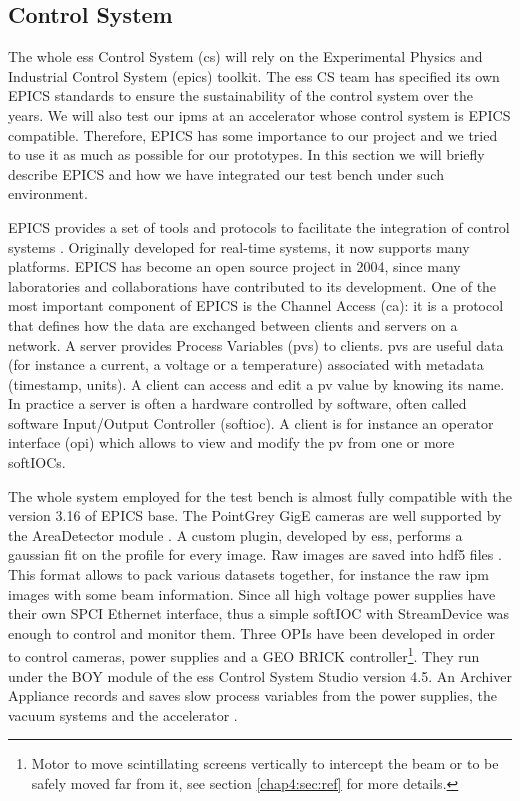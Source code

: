 \begin{refsection}
  

  \subsection{Control System}
  The whole \acrshort{ess} Control System (\acrshort{cs}) will rely on the Experimental Physics and Industrial Control System (\acrshort{epics}) toolkit. The \acrshort{ess} CS team has specified its own EPICS standards to ensure the sustainability of the control system over the years. We will also test our \acrshort{ipm}s at an accelerator whose control system is EPICS compatible. Therefore, EPICS has some importance to our project and we tried to use it as much as possible for our prototypes. In this section we will briefly describe EPICS and how we have integrated our test bench under such environment.

  EPICS provides a set of tools and protocols to facilitate the integration of control systems \cite{epics2019}. Originally developed for real-time systems, it now supports many platforms. EPICS has become an open source project in 2004, since many laboratories and collaborations have contributed to its development.
  One of the most important component of EPICS is the Channel Access (\acrshort{ca}): it is a protocol that defines how the data are exchanged between clients and servers on a network. A server provides Process Variables (\acrshort{pv}s) to clients. \acrshort{pv}s are useful data (for instance a current, a voltage or a temperature) associated with metadata (timestamp, units). A client can access and edit a \acrshort{pv} value by knowing its name. In practice a server is often a hardware controlled by software, often called software Input/Output Controller (\acrshort{softioc}). A client is for instance an operator interface (\acrshort{opi}) which allows to view and modify the \acrshort{pv} from one or more softIOCs.

  The whole system employed for the test bench is almost fully compatible with the version 3.16 of EPICS base. The PointGrey GigE cameras are well supported by the AreaDetector module \cite{ad2019}. A custom plugin, developed by \acrshort{ess}, performs a gaussian fit on the profile for every image. Raw images are saved into \acrshort{hdf}5 files \cite{hdf5}. This format allows to pack various datasets together, for instance the raw \acrshort{ipm} images with some beam information.
  Since all high voltage power supplies have their own SPCI Ethernet interface, thus a simple softIOC with StreamDevice\cite{streamdevice2019} was enough to control and monitor them.
  Three OPIs have been developed in order to control cameras, power supplies and a GEO BRICK controller\footnote{Motor to move scintillating screens vertically to intercept the beam or to be safely moved far from it, see section \ref{chap4:sec:ref} for more details.}. They run under the BOY module of the \acrshort{ess} Control System Studio version 4.5. An Archiver Appliance records and saves slow process variables from the power supplies, the vacuum systems and the accelerator \cite{archiver2019}.


\end{refsection}
